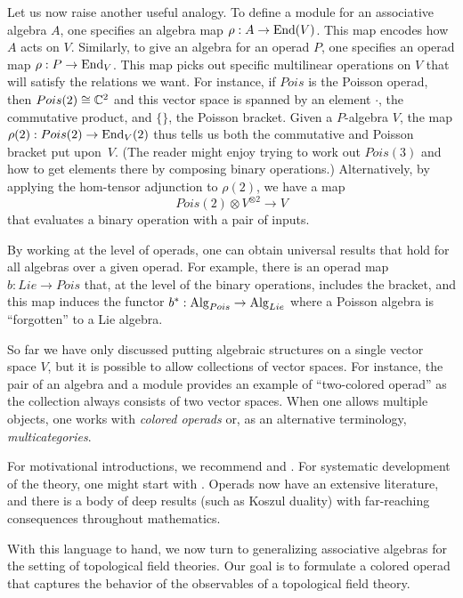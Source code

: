 \documentclass[11pt]{amsart}
\begin{document}
Let us now raise another useful analogy.
To define a module for an associative algebra $A$, one specifies an algebra map $\rho: A \to {\rm End}(V)$.
This map encodes how $A$ acts on $V$.
Similarly, to give an algebra for an operad $P$, one specifies an operad map $\rho: P \to {\rm End}_V$.
This map picks out specific multilinear operations on $V$ that will satisfy the relations we want.
For instance, if $Pois$ is the Poisson operad, then $Pois(2) \cong \mathbb C^2$ and this vector space is spanned by an element $\cdot$, the commutative product, and $\{\}$, the Poisson bracket.
Given a $P$-algebra $V$, the map $\rho(2): Pois(2) \to {\rm End}_V(2)$ thus tells us both the commutative and Poisson bracket put upon~$V$.
(The reader might enjoy trying to work out $Pois(3)$ and how to get elements there by composing binary operations.)
Alternatively, by applying the hom-tensor adjunction to $\rho(2)$, we have a map
\[
Pois(2) \otimes V^{\otimes 2} \to V
\]
that evaluates a binary operation with a pair of inputs.

By working at the level of operads, one can obtain universal results that hold for all algebras over a given operad.
For example, there is an operad map $b: Lie \to Pois$ that, at the level of the binary operations, includes the bracket, 
and this map induces the functor $b^*: {\rm Alg}_{Pois} \to {\rm Alg}_{Lie}$ where a Poisson algebra is ``forgotten'' to a Lie algebra.

So far we have only discussed putting algebraic structures on a single vector space $V$,
but it is possible to allow collections of vector spaces.
For instance, the pair of an algebra and a module provides an example of ``two-colored operad'' as the collection always consists of two vector spaces.
When one allows multiple objects, one works with {\em colored operads} or, as an alternative terminology, {\em multicategories}.

\begin{rmk}
For motivational introductions, we recommend \cite{StashAMS} and \cite{Val12}.
For systematic development of the theory, one might start with \cite{LodVal,Fresse,LurieHA}.
Operads now have an extensive literature, and there is a body of deep results (such as Koszul duality) with far-reaching consequences throughout mathematics.
\end{rmk}

With this language to hand, we now turn to generalizing associative algebras for the setting of topological field theories. 
Our goal is to formulate a colored operad that captures the behavior of the observables of a topological field theory.
\end{document}
